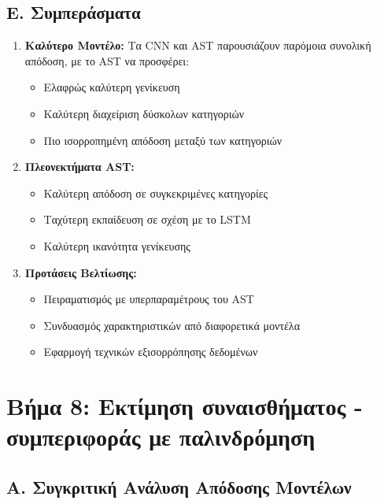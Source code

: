 \documentclass[a4paper,12pt]{article}
\begin{document}
\subsection*{Ε. Συμπεράσματα}

\begin{enumerate}
    \item \textbf{Καλύτερο Μοντέλο:} Τα CNN και AST παρουσιάζουν παρόμοια συνολική απόδοση, με το AST να προσφέρει:
    \begin{itemize}
        \item Ελαφρώς καλύτερη γενίκευση
        \item Καλύτερη διαχείριση δύσκολων κατηγοριών
        \item Πιο ισορροπημένη απόδοση μεταξύ των κατηγοριών
    \end{itemize}
    
    \item \textbf{Πλεονεκτήματα AST:}
    \begin{itemize}
        \item Καλύτερη απόδοση σε συγκεκριμένες κατηγορίες
        \item Ταχύτερη εκπαίδευση σε σχέση με το LSTM
        \item Καλύτερη ικανότητα γενίκευσης
    \end{itemize}
    
    \item \textbf{Προτάσεις Βελτίωσης:}
    \begin{itemize}
        \item Πειραματισμός με υπερπαραμέτρους του AST
        \item Συνδυασμός χαρακτηριστικών από διαφορετικά μοντέλα
        \item Εφαρμογή τεχνικών εξισορρόπησης δεδομένων
    \end{itemize}
\end{enumerate}

\section*{Βήμα 8: Εκτίμηση συναισθήματος - συμπεριφοράς με παλινδρόμηση}

\subsection*{A. Συγκριτική Ανάλυση Απόδοσης Μοντέλων}
\end{document}
